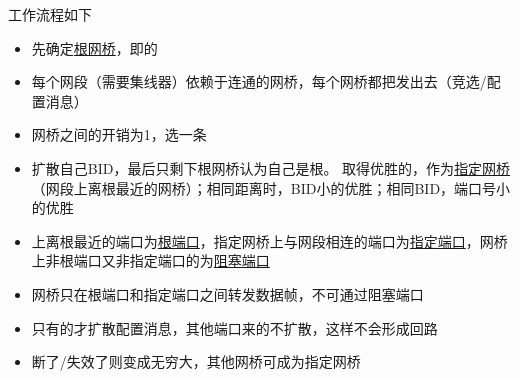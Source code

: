 工作流程如下
\begin{itemize}
\item 先确定\underline{根网桥}，即的
\item 每个网段（需要集线器）依赖于连通的网桥，每个网桥都把发出去（竞选/配置消息）
\item 网桥之间的开销为1，选一条
\item 扩散自己BID，最后只剩下根网桥认为自己是根。
取得优胜的，作为\underline{指定网桥}（网段上离根最近的网桥）；相同距离时，BID小的优胜；相同BID，端口号小的优胜
\item {}上离根最近的端口为\underline{根端口}，指定网桥上与网段相连的端口为\underline{指定端口}，网桥上非根端口又非指定端口的为\underline{阻塞端口}
\item 网桥只在根端口和指定端口之间转发数据帧，不可通过阻塞端口
\item 只有的才扩散配置消息，其他端口来的不扩散，这样不会形成回路
\item 断了/失效了则变成无穷大，其他网桥可成为指定网桥
\end{itemize}


